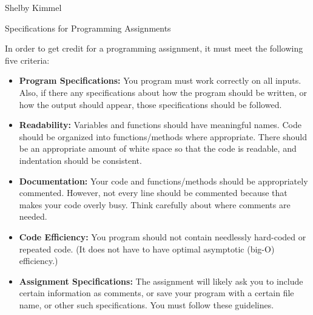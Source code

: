 \documentclass[11pt,landscape]{article}
\begin{document}
\hfill Shelby Kimmel

\begin{center}
{\huge Specifications for Programming Assignments}
\end{center}
\bigskip

In order to get credit for a programming assignment, it must meet the following five criteria:\\

\begin{itemize}
\item \textbf{Program Specifications:} You program must work correctly on all inputs. Also, if there any specifications about how the program should be written, or how the output should appear, those specifications should be followed.\\

\item \textbf{Readability:} Variables and functions should have meaningful names. Code should be organized into functions/methods where appropriate. There should be an appropriate amount of white space so that the code is readable, and indentation should be consistent.\\

\item \textbf{Documentation:} Your code and functions/methods should be appropriately commented. However, not every line should be commented because that makes your code overly busy. Think carefully about where comments are needed. \\

\item \textbf{Code Efficiency:} You program should not contain needlessly hard-coded or repeated code. (It does not have to have optimal asymptotic (big-O) efficiency.)\\

\item \textbf{Assignment Specifications:} The assignment will likely ask you to include certain information as comments, or save your program with a certain file name, or other such specifications. You must follow these guidelines.
\end{itemize}
\end{document}
